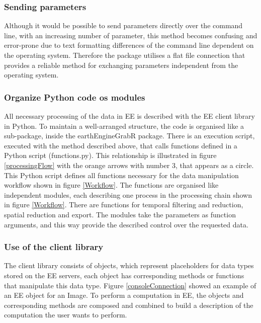 \subsubsection{Sending parameters}

Although it would be possible to send parameters directly over the command line, with an increasing number of parameter, this method becomes confusing and error-prone due to text formatting differences of the command line dependent on the operating system. Therefore the package utilises a flat file connection that provides a reliable method for exchanging parameters independent from the operating system.

\subsubsection{Organize Python code os modules}

All necessary processing of the data in EE is described with the EE client library in Python. To maintain a well-arranged structure, the code is organised like a sub-package, inside the earthEngineGrabR package. There is an execution script, executed with the method described above, that calls functions defined in a Python script (functions.py). This relationship is illustrated in figure \ref{processingFlow} with the orange arrows with number 3, that appears as a circle. This Python script defines all functions necessary for the data manipulation workflow shown in figure \ref*{Workflow}. The functions are organised like independent modules, each describing one process in the processing chain shown in figure \ref*{Workflow}. There are functions for temporal filtering and reduction, spatial reduction and export. The modules take the parameters as function arguments, and this way provide the described control over the requested data.

\subsubsection{Use of the client library}

The client library consists of objects, which represent placeholders for data types stored on the EE servers, each object has corresponding methods or functions that manipulate this data type. Figure \ref{consoleConnection} showed an example of an EE object for an Image. To perform a computation in EE, the objects and corresponding methods are composed and combined to build a description of the computation the user wants to perform. 

